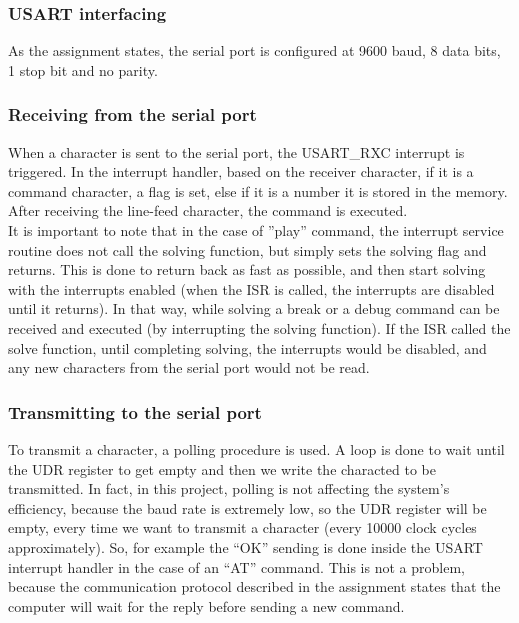 \documentclass[12pt, a4, hidelinks]{article}
\begin{document}
\subsubsection*{USART interfacing}
As the assignment states, the serial port is configured at 9600 baud, 8 data bits, 1 stop bit and no parity.
\subsubsection*{Receiving from the serial port}
When a character is sent to the serial port, the USART\_RXC interrupt is triggered. In the interrupt handler, based on the receiver character, if it is a command character, a flag is set, else if it is a number it is stored in the memory. After receiving the line-feed character, the command is executed. \\
It is important to note that in the case of ''play'' command, the interrupt service routine does not call the solving function, but simply sets the solving flag and returns. This is done to return back as fast as possible, and then start solving with the interrupts enabled (when the ISR is called, the interrupts are disabled until it returns). In that way, while solving a break or a debug command can be received and executed (by interrupting the solving function). If the ISR called the solve function, until completing solving, the interrupts would be disabled, and any new characters from the serial port would not be read.

\subsubsection*{Transmitting to the serial port}
To transmit a character, a polling procedure is used. A loop is done to wait until the UDR register to get empty and then we write the characted to be transmitted. In fact, in this project, polling is not affecting the system's efficiency, because the baud rate is extremely low, so the UDR register will be empty, every time we want to transmit a character (every 10000 clock cycles approximately). So, for example the ``OK'' sending is done inside the USART interrupt handler in the case of an ``AT'' command. This is not a problem, because the communication protocol described in the assignment states that the computer will wait for the reply before sending a new command.
\end{document}
